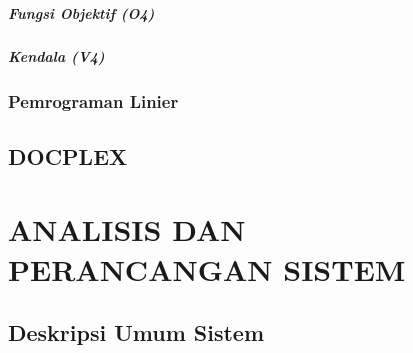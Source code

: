 \documentclass[ugmskripsi]{ugmskripsi}
\begin{document}
			\paragraph{Fungsi Objektif (O4)}
			\label{o4}	
			
			
			\paragraph{Kendala (V4)}
			\label{v4}	
			

		\subsection{Pemrograman Linier}
		\label{MILP}
		
	
	\section{DOCPLEX}
	\label{docplex}
	





\chapter{ANALISIS DAN PERANCANGAN SISTEM}
\label{ANALISIS DAN PERANCANGAN SISTEM}

	\section{Deskripsi Umum Sistem}
	\label{rancangan deskripsi umum sistem}
	
\end{document}
